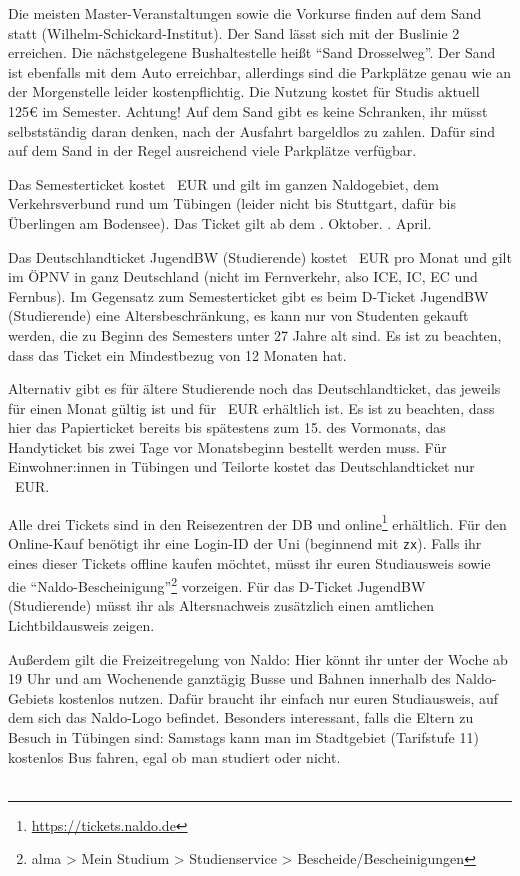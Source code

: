     Die meisten Master-Veranstaltungen sowie die Vorkurse finden auf dem Sand statt (Wilhelm-Schickard-Institut). 
    Der Sand lässt sich mit der Buslinie 2 erreichen. Die nächstgelegene Bushaltestelle heißt "`Sand Drosselweg"'. 
    Der Sand ist ebenfalls mit dem Auto erreichbar, allerdings sind die Parkplätze genau wie an der Morgenstelle leider kostenpflichtig. 
    Die Nutzung kostet für Studis aktuell 125€ im Semester. Achtung! Auf dem Sand gibt es keine Schranken, ihr müsst selbstständig
    daran denken, nach der Ausfahrt bargeldlos zu zahlen. Dafür sind auf dem Sand in der Regel ausreichend viele Parkplätze verfügbar.

    
    Das Semesterticket kostet \semesterticketpreis~EUR und gilt im ganzen Naldogebiet, dem Verkehrsverbund rund um Tübingen (leider nicht bis Stuttgart, dafür bis Überlingen am Bodensee).
    Das Ticket gilt ab dem
    . Oktober.
    \fi
    . April.
    \fi

    Das Deutschlandticket JugendBW (Studierende) kostet \jugendticketbwpreis~EUR pro Monat und gilt im ÖPNV in ganz Deutschland (nicht im Fernverkehr, also ICE, IC, EC und Fernbus). Im Gegensatz zum Semesterticket gibt es beim D-Ticket JugendBW (Studierende) eine Altersbeschränkung,
    es kann nur von Studenten gekauft werden, die zu Beginn des Semesters unter 27 Jahre alt sind. Es ist zu beachten, dass das Ticket ein Mindestbezug von 12 Monaten hat.

    Alternativ gibt es für ältere Studierende noch das Deutschlandticket, das jeweils für einen Monat gültig ist und für \detickettuepreis~EUR erhältlich ist. 
    Es ist zu beachten, dass hier das Papierticket bereits bis spätestens zum 15. des Vormonats, das Handyticket bis zwei Tage vor Monatsbeginn bestellt werden muss.
    Für Einwohner:innen in Tübingen und Teilorte kostet das Deutschlandticket nur \detickettuebewohnipreis~EUR.

    Alle drei Tickets sind in den Reisezentren der DB und online\footnote{\url{https://tickets.naldo.de}} erhältlich. Für den Online-Kauf benötigt ihr eine Login-ID der Uni (beginnend mit \texttt{zx}). Falls ihr eines dieser Tickets offline kaufen möchtet, müsst ihr euren Studiausweis
    sowie die "`Naldo-Bescheinigung"'\footnote{alma > Mein Studium > Studienservice > Bescheide/Bescheinigungen} vorzeigen. Für das D-Ticket JugendBW (Studierende) müsst ihr als Altersnachweis zusätzlich einen amtlichen Lichtbildausweis zeigen. 
    
    Außerdem gilt die Freizeitregelung von Naldo: Hier könnt ihr unter der Woche ab 19 Uhr und am Wochenende ganztägig Busse und Bahnen innerhalb des Naldo-Gebiets kostenlos nutzen. Dafür braucht ihr einfach nur euren Studiausweis, auf dem sich das Naldo-Logo befindet.
    Besonders interessant, falls die Eltern zu Besuch in Tübingen sind: Samstags kann man im Stadtgebiet (Tarifstufe 11) kostenlos Bus fahren, egal ob man studiert oder nicht. \\\\

